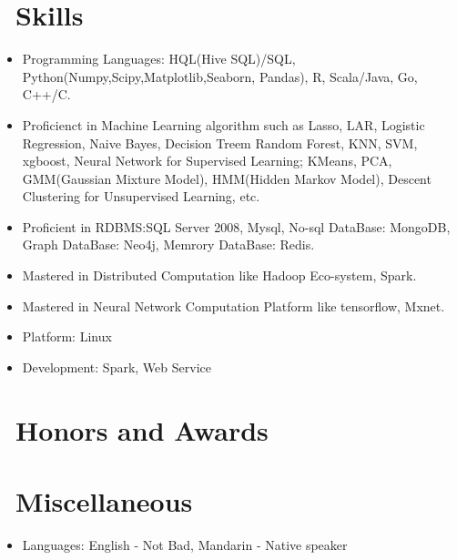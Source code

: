 \documentclass{resume}
\begin{document}

\section{\faCogs\ Skills}
\begin{itemize}[parsep=0.5ex]
  \item Programming Languages: HQL(Hive SQL)/SQL, Python(Numpy,Scipy,Matplotlib,Seaborn, Pandas), R, Scala/Java, Go, C++/C.
  \item Proficienct in Machine Learning algorithm such as Lasso, LAR, Logistic Regression, Naive Bayes, Decision Treem Random Forest, KNN, SVM, xgboost, Neural Network for Supervised Learning; KMeans, PCA, GMM(Gaussian Mixture Model), HMM(Hidden Markov Model), Descent Clustering for Unsupervised Learning, etc.
  \item Proficient in RDBMS:SQL Server 2008, Mysql, No-sql DataBase: MongoDB, Graph DataBase: Neo4j, Memrory DataBase: Redis.
  \item Mastered in Distributed Computation like Hadoop Eco-system, Spark.
  \item Mastered in Neural Network Computation Platform like tensorflow, Mxnet.	  
  \item Platform: Linux
  \item Development: Spark, Web Service
\end{itemize}

\section{\faHeartO\ Honors and Awards}
\section{\faInfo\ Miscellaneous}
\begin{itemize}[parsep=0.5ex]
  \item Languages: English - Not Bad, Mandarin - Native speaker
\end{itemize}

%
%
\end{document}
